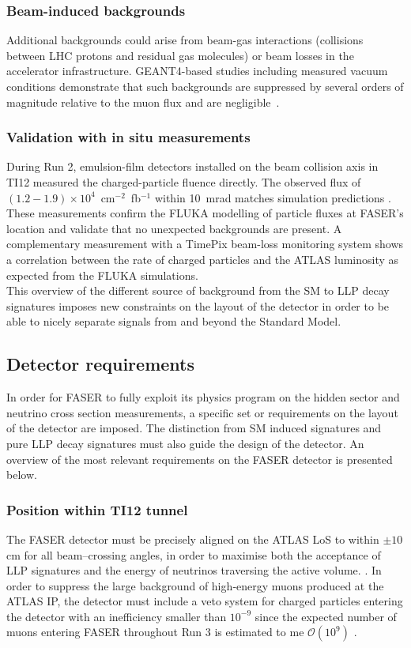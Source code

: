 		\subsubsection{Beam-induced backgrounds}  
		Additional backgrounds could arise from beam-gas interactions (collisions between LHC protons and residual gas molecules) or beam losses in the accelerator infrastructure. GEANT4-based studies including measured vacuum conditions demonstrate that such backgrounds are suppressed by several orders of magnitude relative to the muon flux and are negligible~\cite{FASER_techprop}.


		\subsubsection{Validation with in situ measurements}  
		During Run 2, emulsion-film detectors installed on the beam collision axis in TI12 measured the charged-particle fluence directly. The observed flux of $(1.2-1.9)\times10^4$~cm$^{-2}$~fb$^{-1}$ within \SI{10}{\milli\radian} matches simulation predictions \cite{FASER_techprop}. These measurements confirm the FLUKA modelling of particle fluxes at FASER’s location and validate that no unexpected backgrounds are present. A complementary measurement with a TimePix beam-loss monitoring system shows a correlation between the rate of charged particles and the ATLAS luminosity as expected from the FLUKA simulations. \\
		
		This overview of the different source of background from the SM to LLP decay signatures imposes new constraints on the layout of the detector in order to be able to nicely separate signals from and beyond the Standard Model. 
		
		\subsection{Detector requirements}
		
		In order for FASER to fully exploit its physics program on the hidden sector and neutrino cross section measurements, a specific set or requirements on the layout of the detector are imposed. The distinction from SM induced signatures and pure LLP decay signatures must also guide the design of the detector. An overview of the most relevant requirements on the FASER detector is presented below. 
		
		\subsubsection{Position within TI12 tunnel}
		The FASER detector must be precisely aligned on the ATLAS LoS to within \(\pm10\)\,cm for all beam–crossing angles, in order to maximise both the acceptance of LLP signatures and the energy of neutrinos traversing the active volume. \cite{FASER_Detector}. In order to suppress the large background of high‐energy muons produced at the ATLAS IP, the detector must include a veto system for charged particles entering the detector with an inefficiency smaller than $10^{-9}$ since the expected number of muons entering FASER throughout Run 3 is estimated to me $\mathcal{O}(10^9)$ \cite{FASER_Detector}.
		

